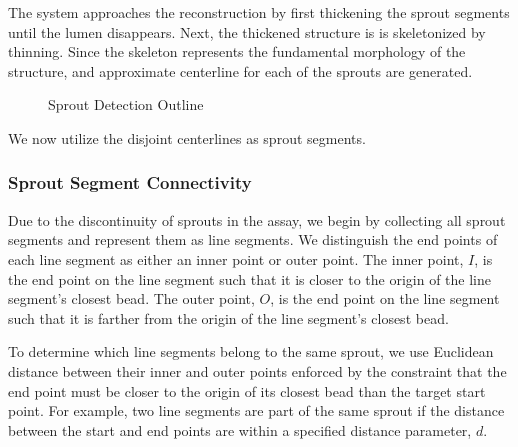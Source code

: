 \documentclass{sig-alternate}
\begin{document}
		The system approaches the reconstruction by first thickening the
		sprout segments until the lumen disappears. Next, the thickened
		structure is is skeletonized by thinning. Since the skeleton
		represents the fundamental morphology of the structure, and
		approximate centerline for each of the sprouts are generated.
		\begin{figure}[htp!]
			\centering
			\caption{Sprout Detection Outline}
			\label{fig:sproutex}
		\end{figure}
		We now utilize the disjoint centerlines as sprout segments.
		
		\subsubsection{Sprout Segment Connectivity} %
		\label{ssub:Sprout Segment Connectivity}
			Due to the discontinuity of sprouts in the assay, we begin by
			collecting all sprout segments and represent them as line
			segments. We distinguish the end points of each line segment
			as either an inner point or outer point. The inner point, $I$,
			is the end point on the line segment such that it is closer to
			the origin of the line segment's closest bead. The outer
			point, $O$, is the end point on the line segment such that it
			is farther from the origin of the line segment's closest bead.

			To determine which line segments belong to the same sprout, we
			use Euclidean distance between their inner and outer points
			enforced by the constraint that the end point must be closer
			to the origin of its closest bead than the target start point.
			For example, two line segments are part of the same sprout if
			the distance between the start and end points are within a
			specified distance parameter, $d$.
\end{document}
